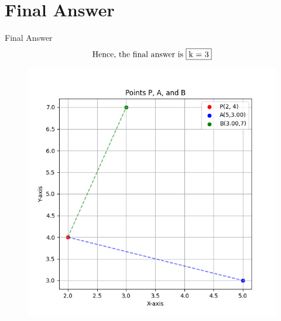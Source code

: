 \documentclass{beamer}
\theoremstyle{remark}
\begin{document}
\section{Final Answer}
\begin{frame}{Final Answer}
\begin{align}
    \text{Hence, the final answer is }\fbox{k = 3} 
\end{align}
\begin{figure}
    \centering
    \includegraphics[width=0.6\columnwidth]{figs/1.png}
\end{figure}
\end{frame}
\end{document}

